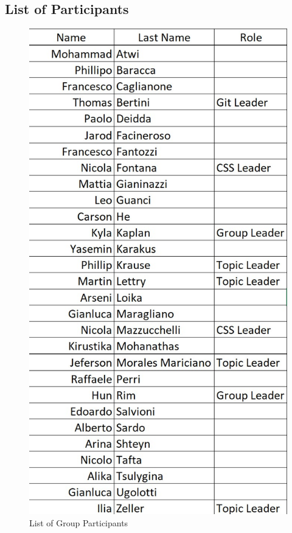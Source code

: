 \documentclass[a4paper,10pt]{article}
\begin{document}
\subsection*{List of Participants}
\begin{figure}[h!]
\includegraphics[height=0.52\paperheight, center]{Group_Participants.jpg}
\caption{List of Group Participants}
\end{figure}
\end{document}
